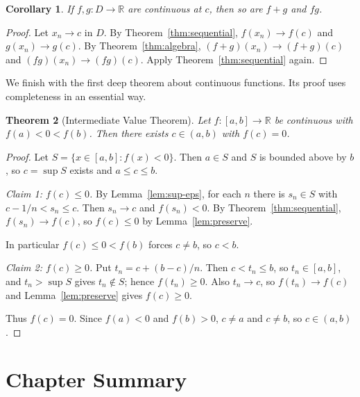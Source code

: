 \documentclass[11pt,a4paper]{book}
\newcommand{\R}{\mathbb{R}}
\numberwithin{equation}{section}          %
\theoremstyle{plain}
\newtheorem{theorem}{Theorem}[section]    %
\newtheorem{corollary}[theorem]{Corollary}
\theoremstyle{definition}
\theoremstyle{remark}
\begin{document}
\begin{corollary}\label{cor:sum-product}
If $f,g:D\to\R$ are continuous at $c$, then so are $f+g$ and $fg$.
\end{corollary}

\begin{proof}
Let $x_n\to c$ in $D$. By Theorem~\ref{thm:sequential}, $f(x_n)\to f(c)$ and $g(x_n)\to g(c)$. By Theorem~\ref{thm:algebra}, $(f+g)(x_n)\to(f+g)(c)$ and $(fg)(x_n)\to(fg)(c)$. Apply Theorem~\ref{thm:sequential} again.
\end{proof}

We finish with the first deep theorem about continuous functions. Its proof uses completeness in an essential way.

\begin{theorem}[Intermediate Value Theorem]\label{thm:ivt}
Let $f:[a,b]\to\R$ be continuous with $f(a)<0<f(b)$. Then there exists $c\in(a,b)$ with $f(c)=0$.
\end{theorem}

\begin{proof}
Let $S=\{x\in[a,b]: f(x)<0\}$. Then $a\in S$ and $S$ is bounded above by $b$, so $c=\sup S$ exists and $a\le c\le b$.

\emph{Claim 1: $f(c)\le0$.} By Lemma~\ref{lem:sup-eps}, for each $n$ there is $s_n\in S$ with $c-1/n<s_n\le c$. Then $s_n\to c$ and $f(s_n)<0$. By Theorem~\ref{thm:sequential}, $f(s_n)\to f(c)$, so $f(c)\le0$ by Lemma~\ref{lem:preserve}.

In particular $f(c)\le0<f(b)$ forces $c\ne b$, so $c<b$.

\emph{Claim 2: $f(c)\ge0$.} Put $t_n=c+(b-c)/n$. Then $c<t_n\le b$, so $t_n\in[a,b]$, and $t_n>\sup S$ gives $t_n\notin S$; hence $f(t_n)\ge0$. Also $t_n\to c$, so $f(t_n)\to f(c)$ and Lemma~\ref{lem:preserve} gives $f(c)\ge0$.

Thus $f(c)=0$. Since $f(a)<0$ and $f(b)>0$, $c\ne a$ and $c\ne b$, so $c\in(a,b)$.
\end{proof}

\section{Chapter Summary}\label{sec:summary}
\end{document}
